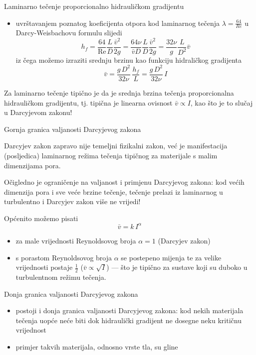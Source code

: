 \documentclass[croatian]{beamer}
\begin{document}
%
\begin{frame}{Laminarno tečenje proporcionalno hidrauličkom gradijentu}
\begin{itemize}
\item uvrštavanjem poznatog koeficijenta otpora kod laminarnog tečenja $\lambda=\frac{64}{Re}$
u Darcy-Weisbachovu formulu slijedi 
\[
h_{f}=\frac{64}{\text{Re}}\frac{L}{D}\frac{\bar{v}^{2}}{2g}=\frac{64\nu}{\bar{v}D}\frac{L}{D}\frac{\bar{v}^{2}}{2g}=\frac{32\nu}{g}\frac{L}{D^{2}}\bar{v}
\]
iz čega možemo izraziti srednju brzinu kao funkciju hidraličkog gradijenta
\[
\bar{v}=\frac{g\,D^{2}}{32\nu}\,\frac{h_{f}}{L}=\frac{g\,D^{2}}{32\nu}\,I
\]
\end{itemize}
\begin{alertblock}{}
Za laminarno tečenje tipično je da je srednja brzina tečenja proporcionalna
hidrauličkom gradijentu, tj. tipična je linearna ovisnost $\bar{v}\propto I$,
kao što je to slučaj u Darcyjevom zakonu! 
\end{alertblock}
\end{frame}
%
\begin{frame}{Gornja granica valjanosti Darcyjevog zakona}
\begin{alertblock}{}
Darcyjev zakon zapravo nije temeljni fizikalni zakon, već je manifestacija
(posljedica) laminarnog režima tečenja tipičnog za materijale s malim
dimenzijama pora. 
\end{alertblock}
\begin{block}{}
Očigledno je ograničenje na valjanost i primjenu Darcyjevog zakona:
kod većih dimenzija pora i sve veće brzine tečenje, tečenje prelazi
iz laminarnog u turbulentno i Darcyjev zakon više ne vrijedi! 

\end{block}
Općenito možemo pisati
\[
\bar{v}=k\,I^{\alpha}
\]

\begin{itemize}
\item za male vrijednosti Reynoldsovog broja $\alpha=1$ (Darcyjev zakon) 
\item s porastom Reynoldsovog broja $\alpha$ se postepeno mijenja te za
velike vrijednosti postaje $\frac{1}{2}$ ($\bar{v}\propto\sqrt{I}$)
--- što je tipično za sustave koji su duboko u turbulentnom režimu
tečenja. 
\end{itemize}
\end{frame}
%
\begin{frame}{Donja granica valjanosti Darcyjevog zakona}
\begin{itemize}
\item postoji i donja granica valjanosti Darcyjevog zakona: kod nekih materijala
tečenja uopće neće biti dok hidraulički gradijent ne dosegne neku
kritičnu vrijednost 
\item primjer takvih materijala, odnosno vrste tla, su gline\vfill{}
 \vfill{}
 \vfill{}
 \vfill{}
 \vfill{}
 \vfill{}
 \vfill{}
 
\end{itemize}
\end{frame}
\end{document}
